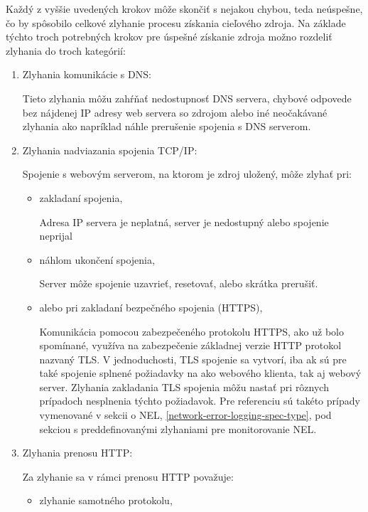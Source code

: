 Každý z vyššie uvedených krokov môže skončiť s nejakou chybou, teda neúspešne, čo by spôsobilo celkové zlyhanie procesu získania cieľového zdroja.
Na základe týchto troch potrebných krokov pre úspešné získanie zdroja možno rozdeliť zlyhania do troch kategórií:
\begin{enumerate}
    \item Zlyhania komunikácie s DNS:

    Tieto zlyhania môžu zahŕňať nedostupnosť DNS servera, chybové odpovede bez nájdenej 
    IP adresy web servera so zdrojom alebo iné neočakávané zlyhania ako napríklad náhle prerušenie spojenia s DNS serverom.
    
    \item Zlyhania nadviazania spojenia TCP/IP:

    Spojenie s webovým serverom, na ktorom je zdroj uložený, môže zlyhať pri:
    \begin{itemize}
        \item zakladaní spojenia,
        
        Adresa IP servera je neplatná, server je nedostupný alebo spojenie neprijal
        
        \item náhlom ukončení spojenia,

        Server môže spojenie uzavrieť, resetovať, alebo skrátka prerušiť.  

        \item alebo pri zakladaní bezpečného spojenia (HTTPS),

        Komunikácia pomocou zabezpečeného protokolu HTTPS, ako už bolo spomínané, využíva na zabezpečenie základnej verzie HTTP protokol nazvaný TLS.
        V jednoduchosti, TLS spojenie sa vytvorí, iba ak sú pre také spojenie splnené požiadavky na ako webového klienta, tak aj webový server. 
        Zlyhania zakladania TLS spojenia môžu nastať pri rôznych prípadoch nesplnenia týchto požiadavok. 
        Pre referenciu sú takéto prípady vymenované v sekcii o NEL, \ref{network-error-logging-spec-type}, 
        pod sekciou s preddefinovanými zlyhaniami pre monitorovanie NEL.
        
    \end{itemize}
    
    \item Zlyhania prenosu HTTP:

    Za zlyhanie sa v rámci prenosu HTTP považuje:
    \begin{itemize}
        \item zlyhanie samotného protokolu,


\end{itemize}
\end{enumerate}
